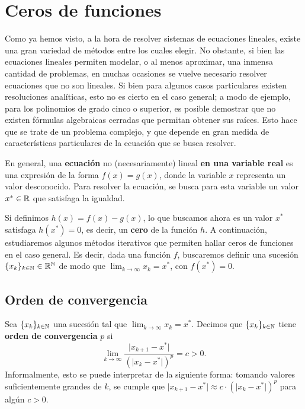 
\section{Ceros de funciones}

Como ya hemos visto, a la hora de resolver sistemas de ecuaciones lineales,
existe una gran variedad de métodos entre los cuales elegir. No obstante, si
bien las ecuaciones lineales permiten modelar, o al menos aproximar, una
inmensa cantidad de problemas, en muchas ocasiones se vuelve necesario
resolver ecuaciones que no son lineales. Si bien para algunos casos
particulares existen resoluciones analíticas, esto no es cierto en el caso
general; a modo de ejemplo, para los polinomios de grado cinco o superior,
es posible demostrar que no existen fórmulas algebraicas cerradas que permitan
obtener sus raíces. Esto hace que se trate de un problema complejo, y que
depende en gran medida de características particulares de la ecuación que se
busca resolver.

En general, una \textbf{ecuación} no (necesariamente) lineal \textbf{en una
variable real} es una expresión de la forma $f(x) = g(x)$, donde la variable
$x$ representa un valor desconocido. Para resolver la ecuación, se busca
para esta variable un valor $x^\ast \in \mathbb{R}$ que satisfaga la igualdad.

Si definimos $h(x) = f(x) - g(x)$, lo que buscamos ahora es un valor $x^\ast$
satisfaga $h(x^\ast) = 0$, es decir, un \textbf{cero} de la función $h$.
A continuación, estudiaremos algunos métodos iterativos que permiten hallar
ceros de funciones en el caso general. Es decir, dada una función $f$,
buscaremos definir una sucesión
$\lbrace x_k \rbrace_{k \in \mathbb{N}} \in \mathbb{R}^{\mathbb{N}}$ de modo que
$\lim_{k \to \infty} x_k = x^\ast$, con $f(x^\ast) = 0$.

\subsection{Orden de convergencia}

Sea $\lbrace x_k \rbrace_{k \in \mathbb{N}}$ una sucesión tal que
$\lim_{k \to \infty} x_k = x^\ast$. Decimos que
$\lbrace x_k \rbrace_{k \in \mathbb{N}}$ tiene \textbf{orden de convergencia} $p$
si
\[ \lim_{k \to \infty} \frac{\lvert x_{k+1} - x^\ast \rvert}
    {\left( \lvert x_k - x^\ast \rvert \right)^p} = c > 0. \]
Informalmente, esto se puede interpretar de la siguiente forma: tomando
valores suficientemente grandes de $k$, se cumple que
$\lvert x_{k+1} - x^\ast \rvert \approx c \cdot \left(\lvert x_k - x^\ast \rvert\right)^p$
para algún $c > 0$.

